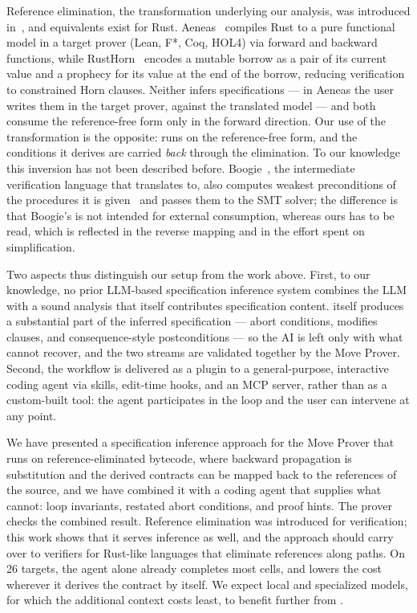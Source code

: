 Reference elimination, the transformation underlying our \WP analysis, was introduced in~\cite{DillGPQXZ22}, and equivalents exist for Rust.
Aeneas~\cite{Aeneas} compiles Rust to a pure functional model in a target prover (Lean, F*, Coq, HOL4) via forward and backward functions, while RustHorn~\cite{RustHorn} encodes a mutable borrow as a pair of its current value and a prophecy for its value at the end of the borrow, reducing verification to constrained Horn clauses.
Neither infers specifications --- in Aeneas the user writes them in the target prover, against the translated model --- and both consume the reference-free form only in the forward direction.
Our use of the transformation is the opposite: \WP runs on the reference-free form, and the conditions it derives are carried \emph{back} through the elimination.
To our knowledge this inversion has not been described before.
Boogie~\cite{boogie,boogieIVL}, the intermediate verification language that \MVP translates to, also computes weakest preconditions of the procedures it is given~\cite{BL05} and passes them to the SMT solver; the difference is that Boogie's \WP is not intended for external consumption, whereas ours has to be read, which is reflected in the reverse mapping and in the effort spent on simplification.

Two aspects thus distinguish our setup from the work above.
First, to our knowledge, no prior LLM-based specification inference system combines the LLM with a sound analysis that itself contributes specification content.
\WP itself produces a substantial part of the inferred specification --- abort conditions, modifies clauses, and consequence-style postconditions --- so the AI is left only with what \WP cannot recover, and the two streams are validated together by the Move Prover.
Second, the workflow is delivered as a plugin to a general-purpose, interactive coding agent via skills, edit-time hooks, and an MCP server, rather than as a custom-built tool: the agent participates in the loop and the user can intervene at any point.

\label{sec:conclusion}

We have presented a specification inference approach for the Move Prover that runs \WP on reference-eliminated bytecode, where backward propagation is substitution and the derived contracts can be mapped back to the references of the source, and we have combined it with a coding agent that supplies what \WP cannot: loop invariants, restated abort conditions, and proof hints. The prover checks the combined result.
Reference elimination was introduced for verification; this work shows that it serves inference as well, and the approach should carry over to verifiers for Rust-like languages that eliminate references along paths.
On 26 targets, the agent alone already completes most cells, and \WP lowers the cost wherever it derives the contract by itself.
We expect local and specialized models, for which the additional context costs least, to benefit further from \WP.

